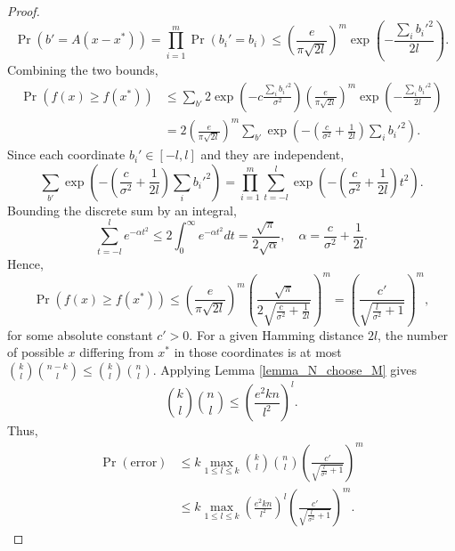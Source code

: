 \documentclass{article}
\begin{document}
\begin{proof}
\[
\Pr(b' = A(x-x^*)) = \prod_{i=1}^m \Pr(b_i'=b_i)
\le \left(\frac{e}{\pi\sqrt{2l}}\right)^m
    \exp\!\left(-\frac{\sum_i b_i'^2}{2l}\right).
\]
Combining the two bounds,
\begin{align*}
\Pr(f(x)\ge f(x^*))
&\le \sum_{b'} 2\exp\!\left(-c\frac{\sum_i b_i'^2}{\sigma^2}\right)
        \left(\frac{e}{\pi\sqrt{2l}}\right)^m
        \exp\!\left(-\frac{\sum_i b_i'^2}{2l}\right)\\
&= 2\left(\frac{e}{\pi\sqrt{2l}}\right)^m
    \sum_{b'} \exp\!\left(-(\frac{c}{\sigma^2}+\frac{1}{2l})\sum_i b_i'^2\right).
\end{align*}
Since each coordinate $b_i'\in[-l,l]$ and they are independent,
\[
\sum_{b'} \exp\!\left(-(\frac{c}{\sigma^2}+\frac{1}{2l})\sum_i b_i'^2\right)
= \prod_{i=1}^m \sum_{t=-l}^l \exp\!\left(-(\frac{c}{\sigma^2}+\frac{1}{2l})t^2\right).
\]
Bounding the discrete sum by an integral,
\[
\sum_{t=-l}^l e^{-\alpha t^2}
\le 2\int_{0}^\infty e^{-\alpha t^2}dt
= \frac{\sqrt{\pi}}{2\sqrt{\alpha}},
\quad \alpha = \frac{c}{\sigma^2}+\frac{1}{2l}.
\]
Hence,
\[
\Pr(f(x)\ge f(x^*))
\le \left(\frac{e}{\pi\sqrt{2l}}\right)^m
     \left(\frac{\sqrt{\pi}}{2\sqrt{\frac{c}{\sigma^2}+\frac{1}{2l}}}\right)^m
= \left(\frac{c'}{\sqrt{\frac{l}{\sigma^2}+1}}\right)^m,
\]
for some absolute constant $c'>0$.
For a given Hamming distance $2l$, the number of possible $x$ differing from $x^*$ in those coordinates is at most ${k \choose l}{n-k \choose l} \le {k \choose l}{n \choose l}$.  
Applying Lemma \ref{lemma_N_choose_M} gives
\[
{k \choose l}{n \choose l} \le
\left(\frac{e^2kn}{l^2}\right)^l.
\]
Thus,
\begin{align*}
\Pr(\text{error})
&\le k \max_{1\le l\le k}
     {k \choose l}{n \choose l}
     \left(\frac{c'}{\sqrt{\frac{l}{\sigma^2}+1}}\right)^m\\
&\le k \max_{1\le l\le k}
     \left(\frac{e^2kn}{l^2}\right)^l
     \left(\frac{c'}{\sqrt{\frac{l}{\sigma^2}+1}}\right)^m.
\end{align*}

\end{proof}
\end{document}
